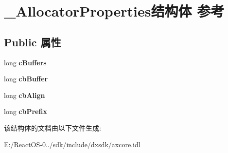 \hypertarget{struct___allocator_properties}{}\section{\+\_\+\+Allocator\+Properties结构体 参考}
\label{struct___allocator_properties}
\subsection*{Public 属性}
\begin{DoxyCompactItemize}
\item 
\mbox{\label{struct___allocator_properties_aa3d8217832745e1e5c8171a008125266}} 
long {\bfseries c\+Buffers}
\item 
\mbox{\label{struct___allocator_properties_aa7e98912870819f779de686bcc2a5aae}} 
long {\bfseries cb\+Buffer}
\item 
\mbox{\label{struct___allocator_properties_a92751ec6d3a9bcdb6c8de105fce4fbbf}} 
long {\bfseries cb\+Align}
\item 
\mbox{\label{struct___allocator_properties_abb59df8c473a53db6ffb220da993d62b}} 
long {\bfseries cb\+Prefix}
\end{DoxyCompactItemize}


该结构体的文档由以下文件生成\+:\begin{DoxyCompactItemize}
\item 
E\+:/\+React\+O\+S-\/0../sdk/include/dxsdk/axcore.\+idl\end{DoxyCompactItemize}
